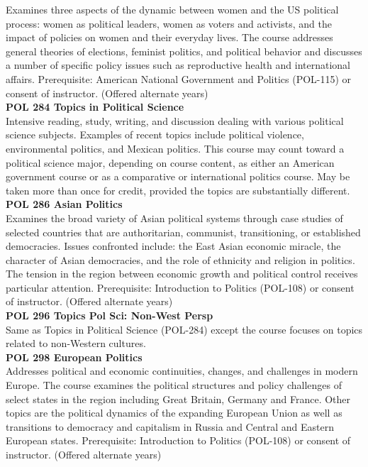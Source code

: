 \documentclass[
  letterpaper,
]{scrbook}
\begin{document}
Examines three aspects of the dynamic between women and the US political
process: women as political leaders, women as voters and activists, and
the impact of policies on women and their everyday lives. The course
addresses general theories of elections, feminist politics, and
political behavior and discusses a number of specific policy issues such
as reproductive health and international affairs. Prerequisite: American
National Government and Politics (POL-115) or consent of instructor.
(Offered alternate years)\\
\textbf{POL 284 Topics in Political Science}\\
Intensive reading, study, writing, and discussion dealing with various
political science subjects. Examples of recent topics include political
violence, environmental politics, and Mexican politics. This course may
count toward a political science major, depending on course content, as
either an American government course or as a comparative or
international politics course. May be taken more than once for credit,
provided the topics are substantially different.\\
\textbf{POL 286 Asian Politics}\\
Examines the broad variety of Asian political systems through case
studies of selected countries that are authoritarian, communist,
transitioning, or established democracies. Issues confronted include:
the East Asian economic miracle, the character of Asian democracies, and
the role of ethnicity and religion in politics. The tension in the
region between economic growth and political control receives particular
attention. Prerequisite: Introduction to Politics (POL-108) or consent
of instructor. (Offered alternate years)\\
\textbf{POL 296 Topics Pol Sci: Non-West Persp}\\
Same as Topics in Political Science (POL-284) except the course focuses
on topics related to non-Western cultures.\\
\textbf{POL 298 European Politics}\\
Addresses political and economic continuities, changes, and challenges
in modern Europe. The course examines the political structures and
policy challenges of select states in the region including Great
Britain, Germany and France. Other topics are the political dynamics of
the expanding European Union as well as transitions to democracy and
capitalism in Russia and Central and Eastern European states.
Prerequisite: Introduction to Politics (POL-108) or consent of
instructor. (Offered alternate years)\\
\end{document}
